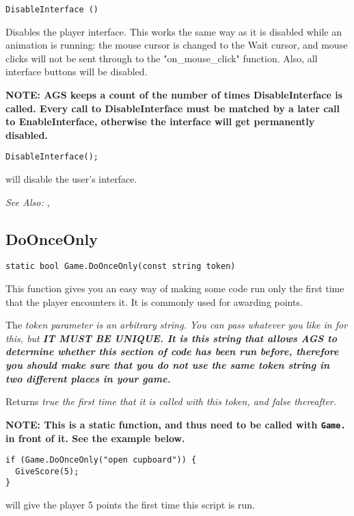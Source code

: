 \begin{verbatim}
DisableInterface ()
\end{verbatim}
Disables the player interface. This works the same way as it is disabled
while an animation is running: the mouse cursor is changed to the Wait
cursor, and mouse clicks will not be sent through to the "on_mouse_click"
function. Also, all interface buttons will be disabled.

\bf{NOTE:} AGS keeps a count of the number of times DisableInterface is called. Every
call to DisableInterface must be matched by a later call to EnableInterface, otherwise
the interface will get permanently disabled.

\begin{verbatim}
DisableInterface();
\end{verbatim}
will disable the user's interface.

\it{See Also:} , 


\subsection{DoOnceOnly}\label{Game.DoOnceOnly}%

\begin{verbatim}
static bool Game.DoOnceOnly(const string token)
\end{verbatim}
This function gives you an easy way of making some code run only the first time that
the player encounters it. It is commonly used for awarding points.

The \it{token} parameter is an arbitrary string. You can pass whatever you like in
for this, but \bf{IT MUST BE UNIQUE}. It is this string that allows AGS to determine
whether this section of code has been run before, therefore you should make sure
that \bf{you do not use the same token string in two different places in your game}.

Returns \it{true} the first time that it is called with this token, and \it{false} thereafter.

\bf{NOTE:} This is a static function, and thus need to be called with \verb$Game.$ in front of it. See
the example below.

\begin{verbatim}
if (Game.DoOnceOnly("open cupboard")) {
  GiveScore(5);
}
\end{verbatim}
will give the player 5 points the first time this script is run.

